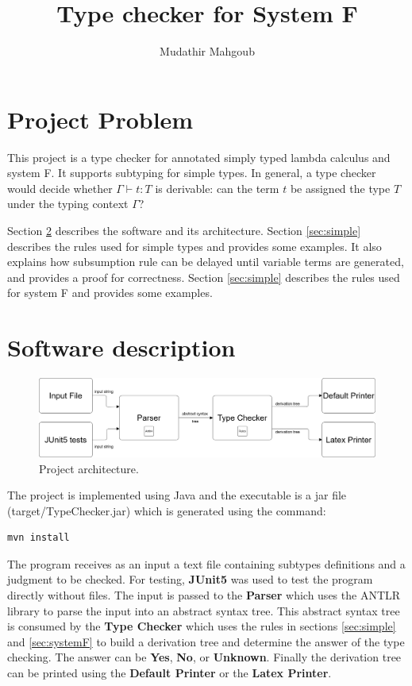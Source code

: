 \documentclass[12pt,a4paper]{article}
\author{Mudathir Mahgoub}
\title{Type checker for System F}
\begin{document}
\maketitle

\section {Project Problem}

This project is a type checker for annotated simply typed lambda calculus and system F. It supports subtyping for simple types. In general, a type checker would decide whether $\Gamma \vdash t: T$ is derivable: can the term $t$ be assigned the type $T$ under the typing context $\Gamma$?

Section \ref{sec:software} describes the software and its architecture. Section \ref{sec:simple} describes the rules used for simple types and provides some examples. It also explains how subsumption rule can be delayed until variable terms are generated, and provides a proof for correctness. Section \ref{sec:simple} describes the rules used for system F and provides some examples.

\section{Software description} \label{sec:software}


\begin{figure}[h]
 \centering
 \includegraphics[scale=.25,keepaspectratio=true]{./typechecker.png}
 \caption{Project architecture.}
 \label{fig:gantt_chart}
\end{figure}

The project is implemented using Java and the executable is a jar file (target/TypeChecker.jar) which is generated using the command:

\begin{lstlisting}  
mvn install
\end{lstlisting}  

The program receives as an input a text file containing subtypes definitions and a judgment to be checked. For testing, \textbf{JUnit5} was used to test the program directly without files. The input is passed to the \textbf{Parser} which uses the ANTLR library to parse the input into an abstract syntax tree. This abstract syntax tree is consumed by the \textbf{Type Checker} which uses the rules in sections \ref{sec:simple} and \ref{sec:systemF} to build a derivation tree and determine the answer of the type checking. The answer can be \textbf{Yes}, \textbf{No}, or \textbf{Unknown}. Finally the derivation tree can be printed using the \textbf{Default Printer} or the \textbf{Latex Printer}.
\end{document}
